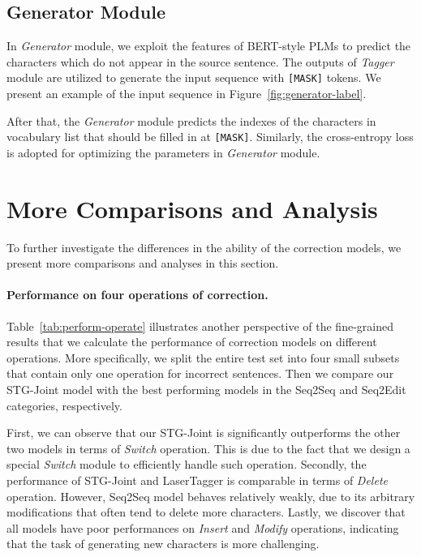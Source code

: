 \documentclass[11pt]{article}
\begin{document}
\subsection{Generator Module}

In \emph{Generator} module, we exploit the features of BERT-style PLMs to predict the characters which do not appear in the source sentence. The outputs of \emph{Tagger} module are utilized to generate the input sequence with \texttt{[MASK]} tokens. We present an example of the input sequence in Figure~\ref{fig:generator-label}.

After that, the \emph{Generator} module predicts the indexes of the characters in vocabulary list that should be filled in at \texttt{[MASK]}. Similarly, the cross-entropy loss is adopted for optimizing the parameters in \emph{Generator} module.  

\section{More Comparisons and Analysis}
\label{appendix:more-analysis}

To further investigate the differences in the ability of the correction models, we present more comparisons and analyses in this section. 

\paragraph{Performance on four operations of correction.} Table~\ref{tab:perform-operate} illustrates another perspective of the fine-grained results that we calculate the performance of correction models on different operations. More specifically, we split the entire test set into four small subsets that contain only one operation for incorrect sentences. Then we compare our STG-Joint model with the best performing models in the Seq2Seq and Seq2Edit categories, respectively.

First, we can observe that our STG-Joint is significantly outperforms the other two models in terms of \emph{Switch} operation. This is due to the fact that we design a special \emph{Switch} module to efficiently handle such operation. Secondly, the performance of STG-Joint and LaserTagger is comparable in terms of \emph{Delete} operation. However, Seq2Seq model behaves relatively weakly, due to its arbitrary modifications that often tend to delete more characters. Lastly, we discover that all models have poor performances on \emph{Insert} and \emph{Modify} operations, indicating that the task of generating new characters is more challenging.
\end{document}
